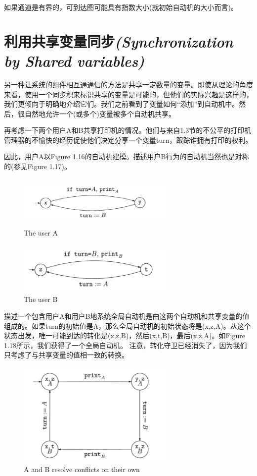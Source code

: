 \documentclass{book}
\begin{document}
    如果通道是有界的，可到达图可能具有指数大小(就初始自动机的大小而言)。

    \section{利用共享变量同步{\itshape (Synchronization by Shared variables)}}
    另一种让系统的组件相互通通信的方法是共享一定数量的变量。即使从理论的角度来看，使用一个同步积来标识共享的变量是可能的，但他们的实际兴趣是这样的，我们更倾向于明确地介绍它们。我们之前看到了变量如何“添加”到自动机中。然后，很自然地允许一个(或多个)变量被多个自动机共享。

    再考虑一下两个用户A和B共享打印机的情况。他们与来自1.3节的不公平的打印机管理器的不愉快的经历促使他们决定分享一个变量turn，跟踪谁拥有打印的权利。

    因此，用户A以Figure 1.16的自动机建模。描述用户B行为的自动机当然也是对称的(参见Figure 1.17)。
    \begin{figure}
    \centering
    \includegraphics[height=1in,width=3.0in]{1_16.png}
    \caption{The user A}
    \end{figure}
    \begin{figure}
    \centering
    \includegraphics[height=1in,width=3.0in]{1_17.png}
    \caption{The user B}
    \end{figure}

    描述一个包含用户A和用户B地系统全局自动机是由这两个自动机和共享变量的值组成的。如果turn的初始值是A，那么全局自动机的初始状态将是(x,z,A)。从这个状态出发，唯一可能到达的转化是(x,z,B)，然后(x,t,B)，最后(x,z,A)。如Figure 1.18所示，我们获得了一个全局自动机。
    注意，转化守卫已经消失了，因为我们只考虑了与共享变量的值相一致的转换。
    \begin{figure}
    \centering
    \includegraphics[height=2in,width=3.0in]{1_18.png}
    \caption{A and B resolve conflicts on their own}
    \end{figure}
\end{document}
